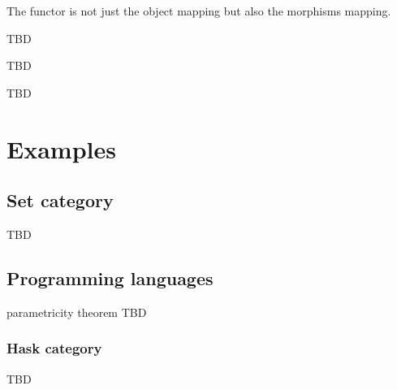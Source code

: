The functor is not just the object mapping but also the morphisms
mapping. 



TBD

\begin{definition}
\label{def:nt}
TBD
\end{definition}

TBD

\section{Examples}

\subsection{\textbf{Set} category}
TBD

\subsection{Programming languages}

\begin{theorem}[Reynolds]
\label{thm:reynolds}
 parametricity theorem 
TBD
\end{theorem}

\subsubsection{\textbf{Hask} category}
TBD
